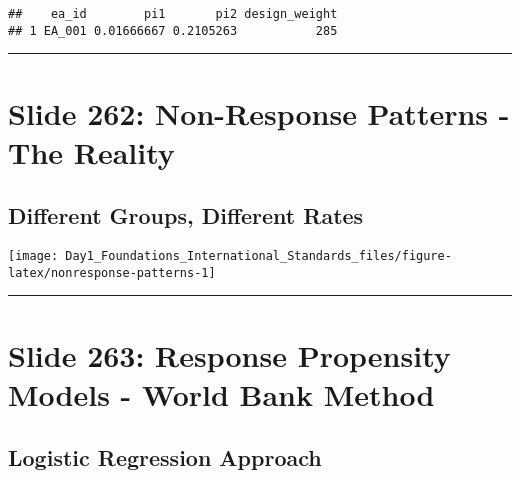 \documentclass[
]{article}
\begin{document}
\begin{verbatim}
##    ea_id        pi1       pi2 design_weight
## 1 EA_001 0.01666667 0.2105263           285
\end{verbatim}

\begin{center}\rule{0.5\linewidth}{0.5pt}\end{center}

\section{Slide 262: Non-Response Patterns - The
Reality}\label{slide-262-non-response-patterns---the-reality}

\subsection{Different Groups, Different
Rates}\label{different-groups-different-rates}

\texttt{[image: Day1\_Foundations\_International\_Standards\_files/figure-latex/nonresponse-patterns-1]}

\begin{center}\rule{0.5\linewidth}{0.5pt}\end{center}

\section{Slide 263: Response Propensity Models - World Bank
Method}\label{slide-263-response-propensity-models---world-bank-method}

\subsection{Logistic Regression
Approach}\label{logistic-regression-approach}
\end{document}
